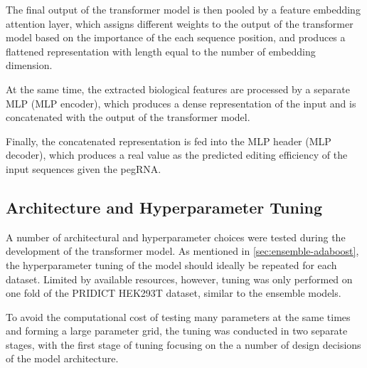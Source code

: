 The final output of the transformer model is then pooled by a feature embedding attention layer, which assigns different weights to the output of the transformer model based on the importance of the each sequence position, and produces a flattened representation with length equal to the number of embedding dimension.

At the same time, the extracted biological features are processed by a separate MLP (MLP encoder), which produces a dense representation of the input and is concatenated with the output of the transformer model. 

Finally, the concatenated representation is fed into the MLP header (MLP decoder), which produces a real value as the predicted editing efficiency of the input sequences given the pegRNA.

\subsection{Architecture and Hyperparameter Tuning}

A number of architectural and hyperparameter choices were tested during the development of the transformer model. As mentioned in \autoref{sec:ensemble-adaboost}, the hyperparameter tuning of the model should ideally be repeated for each dataset. Limited by available resources, however, tuning was only performed on one fold of the PRIDICT HEK293T dataset, similar to the ensemble models.


To avoid the computational cost of testing many parameters at the same times and forming a large parameter grid, the tuning was conducted in two separate stages, with the first stage of tuning focusing on the a number of design decisions of the model architecture. 

